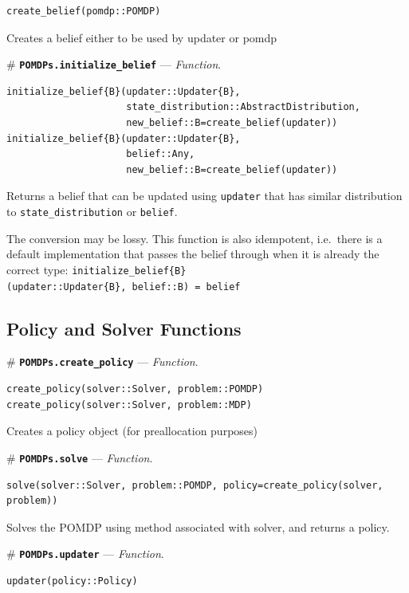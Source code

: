 \documentclass[12pt,]{article}
\begin{document}
\begin{verbatim}
create_belief(pomdp::POMDP)
\end{verbatim}

Creates a belief either to be used by updater or pomdp

\# \textbf{\texttt{POMDPs.initialize\_belief}} --- \emph{Function}.

\begin{verbatim}
initialize_belief{B}(updater::Updater{B}, 
                     state_distribution::AbstractDistribution,
                     new_belief::B=create_belief(updater))
initialize_belief{B}(updater::Updater{B},
                     belief::Any,
                     new_belief::B=create_belief(updater))
\end{verbatim}

Returns a belief that can be updated using \texttt{updater} that has
similar distribution to \texttt{state\_distribution} or \texttt{belief}.

The conversion may be lossy. This function is also idempotent,
i.e.~there is a default implementation that passes the belief through
when it is already the correct type:
\texttt{initialize\_belief\{B\}(updater::Updater\{B\},\ belief::B)\ =\ belief}

\subsection{Policy and Solver
Functions}\label{policy-and-solver-functions}

\# \textbf{\texttt{POMDPs.create\_policy}} --- \emph{Function}.

\begin{verbatim}
create_policy(solver::Solver, problem::POMDP)
create_policy(solver::Solver, problem::MDP)
\end{verbatim}

Creates a policy object (for preallocation purposes)

\# \textbf{\texttt{POMDPs.solve}} --- \emph{Function}.

\begin{verbatim}
solve(solver::Solver, problem::POMDP, policy=create_policy(solver, problem))
\end{verbatim}

Solves the POMDP using method associated with solver, and returns a
policy.

\# \textbf{\texttt{POMDPs.updater}} --- \emph{Function}.

\begin{verbatim}
updater(policy::Policy)
\end{verbatim}
\end{document}

